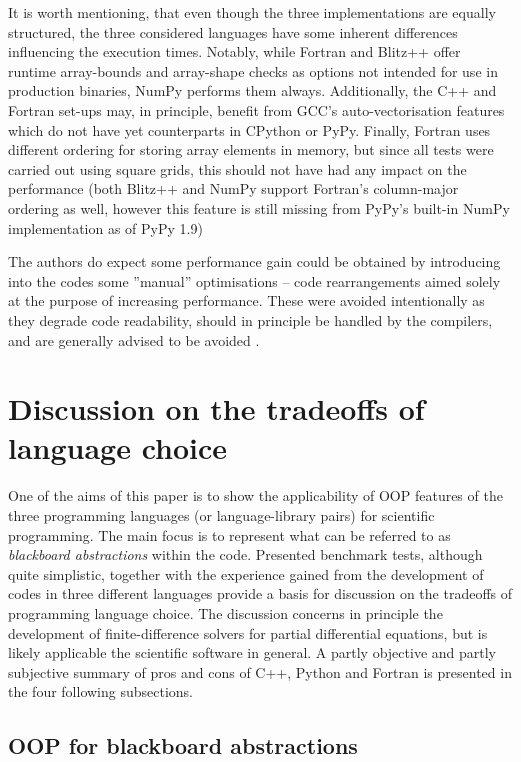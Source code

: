 \documentclass[final,5p,times,twocolumn]{elsarticle}
\begin{document}
  It is worth mentioning, that even though the three implementations are equally structured,
    the three considered languages have some inherent differences influencing the execution times.
  Notably, while Fortran and Blitz++ offer runtime array-bounds and array-shape checks as options
    not intended for use in production binaries, NumPy performs them always.
  Additionally, the C++ and Fortran set-ups may, in principle, benefit from GCC's auto-vectorisation
    features which do not have yet counterparts in CPython or PyPy.
  Finally, Fortran uses different ordering for storing array elements in memory, but since
    all tests were carried out using square grids, this should not have had any impact on the
    performance (both Blitz++ and NumPy support Fortran's column-major ordering as well, 
    however this feature is still missing from PyPy's built-in NumPy implementation as of PyPy 1.9)

  The authors do expect some performance gain could 
    be obtained by introducing into the codes some ''manual'' optimisations -- 
    code rearrangements aimed solely at the purpose of increasing performance.
  These were avoided intentionally as they degrade code readability,
    should in principle be handled by the compilers,
    and are generally advised to be avoided \citep[e.g.][section 3.12]{bib_CERNcpp}.
 
  \section{Discussion on the tradeoffs of language choice}

  One of the aims of this paper is to show the applicability of OOP features of the three
    programming languages (or language-library pairs) for scientific programming.
  The main focus is to represent
    what can be referred to as {\em blackboard abstractions} \citep{Rouson_et_al_2012} within the code.
  Presented benchmark tests, although quite simplistic, together with the experience gained 
    from the development of codes in three different
    languages provide a basis for discussion on the tradeoffs of programming language choice.
  The discussion concerns in principle the development of finite-difference solvers for 
    partial differential equations, but is likely applicable the scientific software in general.
  A partly objective and partly subjective summary of pros and cons of C++, Python and Fortran
    is presented in the four following subsections.

  \subsection{OOP for blackboard abstractions}
\end{document}
